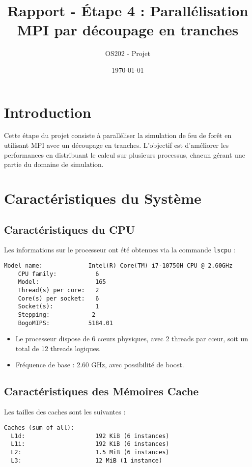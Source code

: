 \documentclass[11pt]{article}
\title{Rapport - Étape 4 : Parallélisation MPI par découpage en tranches}
\author{OS202 - Projet}
\date{\today}
\begin{document}
\maketitle

\section{Introduction}
Cette étape du projet consiste à paralléliser la simulation de feu de forêt en utilisant MPI avec un découpage en tranches. L'objectif est d'améliorer les performances en distribuant le calcul sur plusieurs processus, chacun gérant une partie du domaine de simulation.

\section{Caractéristiques du Système}

\subsection{Caractéristiques du CPU}
Les informations sur le processeur ont été obtenues via la commande \texttt{lscpu} :
\begin{verbatim}
Model name:             Intel(R) Core(TM) i7-10750H CPU @ 2.60GHz
    CPU family:           6
    Model:                165
    Thread(s) per core:   2
    Core(s) per socket:   6
    Socket(s):            1
    Stepping:            2
    BogoMIPS:           5184.01
\end{verbatim}

\begin{itemize}
    \item Le processeur dispose de 6 cœurs physiques, avec 2 threads par cœur, soit un total de 12 threads logiques.
    \item Fréquence de base : 2.60 GHz, avec possibilité de boost.
\end{itemize}

\subsection{Caractéristiques des Mémoires Cache}
Les tailles des caches sont les suivantes :
\begin{verbatim}
Caches (sum of all):      
  L1d:                    192 KiB (6 instances)
  L1i:                    192 KiB (6 instances)
  L2:                     1.5 MiB (6 instances)
  L3:                     12 MiB (1 instance)
\end{verbatim}
\end{document}
